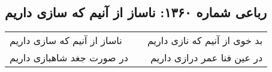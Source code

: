 \begin{center}
\section*{رباعی شماره ۱۳۶۰: ناساز از آنیم که سازی داریم}
\label{sec:1360}
\begin{longtable}{l p{0.5cm} r}
ناساز از آنیم که سازی داریم
&&
بد خوی از آنیم که نازی داریم
\\
در صورت جغد شاهبازی داریم
&&
در عین فنا عمر درازی داریم
\\
\end{longtable}
\end{center}
